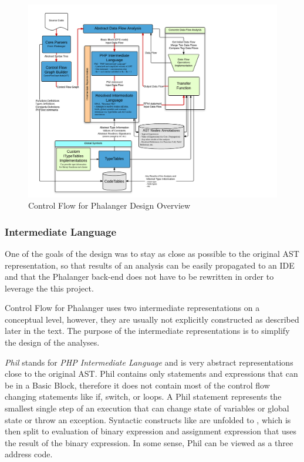 \begin{figure}[h]  
  \centering
    \includegraphics*[width=\textwidth,height=\textheight,keepaspectratio,viewport=0 15 565 590]{img/ControlFlowModules.pdf}  
    \caption{Control Flow for Phalanger Design Overview\label{overalldiagram}}
\end{figure}    

    \subsubsection*{Intermediate Language}
    One of the goals of the design was to stay as close as possible 
    to the original AST representation, so that results of an 
    analysis can be easily propagated to an IDE and that the 
    Phalanger back-end does not have to be rewritten in order to 
    leverage the this project.
    
    Control Flow for Phalanger uses two intermediate representations 
    on a conceptual level, however, they are usually not explicitly 
    constructed as described later in the text. The purpose of the 
    intermediate representations is to simplify the design of the 
    analyses.
    
    \emph{Phil} stands for \emph{PHP Intermediate Language} and is very abstract 
    representations close to the original AST. Phil contains 
    only statements and expressions that can be in a Basic Block, 
    therefore it does not contain most of the control flow 
    changing statements like if, switch, or loops. 
    A Phil statement represents the smallest single step 
    of an execution that can change state of variables 
    or global state or throw an exception. Syntactic 
    constructs like  are unfolded to 
    , which is then split to 
    evaluation of binary expression and assignment expression 
    that uses the result of the binary expression. In some sense, 
    Phil can be viewed as a three address code.
    
